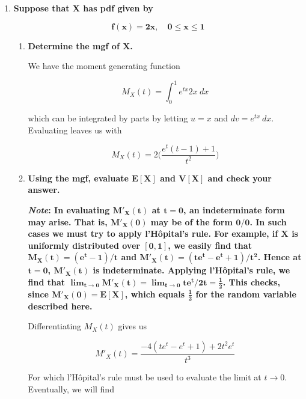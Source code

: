 \documentclass[10pt, oneside]{article}
\begin{document}
\begin{enumerate}[label=10.\arabic*]
\itemsep0em 
\item  \begin{tcolorbox}[
  colback=Cerulean!5!white,
  colframe=Cerulean!75!black]
\textbf{Suppose that $\bm{X}$ has pdf given by}

\[ \bm{f(x) = 2x, \quad 0 \leq x \leq 1} \]
\end{tcolorbox}

	\begin{enumerate}
	\item  \begin{tcolorbox}[
	  colback=Cerulean!5!white,
	  colframe=Cerulean!75!black]
	\textbf{Determine the mgf of $\bm{X}$.}
	\end{tcolorbox}
	
	We have the moment generating function
	
	\[ M_X (t) = \int^1_0 e^{tx} 2x \ dx \]
	
	which can be integrated by parts by letting $u = x$ and $dv = e^{tx} \ dx$. Evaluating leaves us with
	
	\[ \boxed{M_X(t) = 2 \bigg( \frac{e^t (t-1) + 1}{t^2} \bigg) } \]
	
	\item  \begin{tcolorbox}[
	  colback=Cerulean!5!white,
	  colframe=Cerulean!75!black]
	\textbf{Using the mgf, evaluate $\bm{E[X]}$ and $\bm{V[X]}$ and check your answer.}
	
	\textbf{\textit{Note}: In evaluating $\bm{M'_X(t)}$ at $\bm{t=0}$, an indeterminate form may arise. That is, $\bm{M'_X(0)}$ may be of the form $\bm{0/0}$. In such cases we must try to apply l'H\^{o}pital's rule. For example, if $\bm{X}$ is uniformly distributed over $\bm{[0,1]}$, we easily find that $\bm{M_X(t) = (e^t - 1)/t}$ and $\bm{M'_X(t) = (te^t - e^t + 1)/t^2}$. Hence at $\bm{t=0}$, $\bm{M'_X(t)}$ is indeterminate. Applying l'H\^{o}pital's rule, we find that $\bm{\lim_{t \rightarrow 0} M'_X(t) = \lim_{t \rightarrow 0} te^t / 2t = \frac{1}{2}}$. This checks, since $\bm{M'_X(0) = E[X]}$, which equals $\bm{\frac{1}{2}}$ for the random variable described here.}
	\end{tcolorbox}
	
	Differentiating $M_X (t)$ gives us
	
	\[ M'_X(t) = \frac{-4(te^t - e^t + 1) + 2t^2 e^t}{t^3} \]
	
	For which  l'H\^{o}pital's rule must be used to evaluate the limit at $t \rightarrow 0$. Eventually, we will find
	

\end{enumerate}
\end{enumerate}
\end{document}
